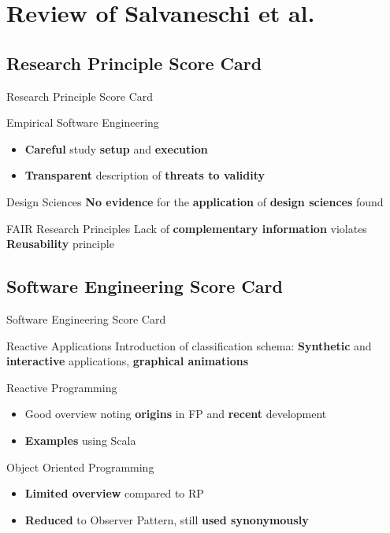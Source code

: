 \documentclass{beamer}
\begin{document}
\section{Review of Salvaneschi et al.}
\subsection*{Research Principle Score Card}
\begin{frame}{Research Principle Score Card}
	\begin{exampleblock}{Empirical Software Engineering}
		\begin{itemize}
			\item \textbf{Careful} study \textbf{setup} and \textbf{execution}
			\item \textbf{Transparent} description of \textbf{threats to validity}
		\end{itemize}
	\end{exampleblock}

	\begin{alertblock}{Design Sciences}
		\textbf{No evidence} for the \textbf{application} of \textbf{design sciences} found
	\end{alertblock}

	\begin{alertblock}{FAIR Research Principles}
		Lack of \textbf{complementary information} violates \textbf{Reusability} principle
	\end{alertblock}
\end{frame}

\subsection*{Software Engineering Score Card}
\begin{frame}{Software Engineering Score Card}
	\begin{exampleblock}{Reactive Applications}
		Introduction of classification schema: \textbf{Synthetic} and \textbf{interactive} applications, \textbf{graphical animations}
	\end{exampleblock}
	\begin{exampleblock}{Reactive Programming}
		\begin{itemize}
			\item Good overview noting \textbf{origins} in FP and \textbf{recent} development
			\item \textbf{Examples} using Scala
		\end{itemize}
	\end{exampleblock}

	\begin{alertblock}{Object Oriented Programming}
		\begin{itemize}
			\item \textbf{Limited overview} compared to RP
			\item \textbf{Reduced} to Observer Pattern, still \textbf{used synonymously}
		\end{itemize}
	\end{alertblock}
\end{frame}
\end{document}
